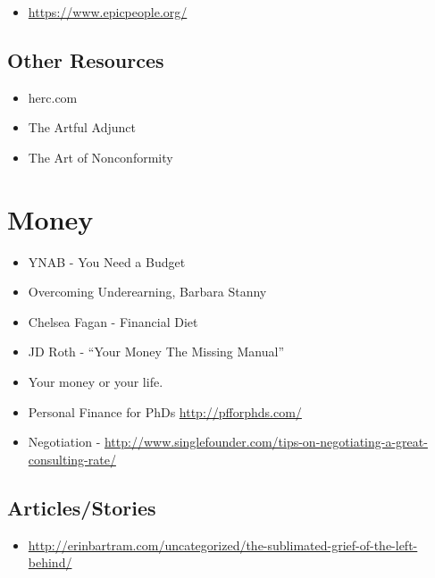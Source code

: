 \documentclass[]{book}
\providecommand{\tightlist}{%
  \setlength{\itemsep}{0pt}\setlength{\parskip}{0pt}}
\begin{document}
\begin{itemize}
\tightlist
\item
  \url{https://www.epicpeople.org/}
\end{itemize}

\section{Other Resources}\label{other-resources}

\begin{itemize}
\tightlist
\item
  herc.com
\item
  The Artful Adjunct
\item
  The Art of Nonconformity
\end{itemize}

\chapter{Money}\label{money}

\begin{itemize}
\tightlist
\item
  YNAB - You Need a Budget
\item
  Overcoming Underearning, Barbara Stanny
\item
  Chelsea Fagan - Financial Diet
\item
  JD Roth - ``Your Money The Missing Manual''
\item
  Your money or your life.
\item
  Personal Finance for PhDs \url{http://pfforphds.com/}
\item
  Negotiation -
  \url{http://www.singlefounder.com/tips-on-negotiating-a-great-consulting-rate/}
\end{itemize}

\section{Articles/Stories}\label{articlesstories}

\begin{itemize}
\tightlist
\item
  \url{http://erinbartram.com/uncategorized/the-sublimated-grief-of-the-left-behind/}
\end{itemize}


\end{document}
